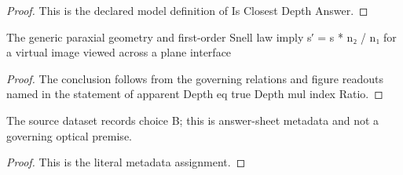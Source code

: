 \begin{proof}
  This is the declared model definition of Is Closest Depth Answer.
\end{proof}
\begin{lemma}
  \label{lem:physics:phyx-mini-0158:phyxminiproblems-problemphyxmini0158-apparentdepth-eq-truedepth-mul-indexratio}
  The generic paraxial geometry and first-order Snell law imply s′ = s * n₂ / n₁ for a virtual image viewed across a plane interface
\end{lemma}
\begin{proof}
  The conclusion follows from the governing relations and figure readouts named in the statement of apparent Depth eq true Depth mul index Ratio.
\end{proof}
\begin{definition}
  \label{def:physics:phyx-mini-0158:phyxminiproblems-problemphyxmini0158-recordedanswerchoice}
  The source dataset records choice B; this is answer-sheet metadata and not a governing optical premise.
\end{definition}
\begin{proof}
  This is the literal metadata assignment.
\end{proof}
